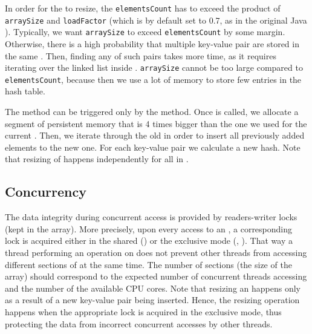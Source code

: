     In order for the \internalHashMap to resize, the \texttt{elementsCount} has to exceed the product of \texttt{arraySize} and \texttt{loadFactor} (which is by default set to 0.7, as in the original Java \HashMap \cite{HashMapJava}).
    Typically, we want \texttt{arraySize} to exceed \texttt{elementsCount} by some margin. 
    Otherwise, there is a high probability that multiple key-value pair are stored in the same \Segment. 
    Then, finding any of such pairs takes more time, as it requires iterating over the linked list inside \Segment. 
    \texttt{arraySize} cannot be too large compared to \texttt{elementsCount}, because then we use a lot of memory to store few entries in the hash table.

    The \expandMethod method can be triggered only by the \insertMethod method.
    Once \expandMethod is called, we allocate a segment of persistent memory that is 4 times bigger than the one we used for the current \internalHashMap. 
    Then, we iterate through the old \internalHashMap in order to insert all previously added elements to the new one. 
    For each key-value pair we calculate a new hash. 
    Note that resizing of \internalHashMap happens independently for all \internalHashMap in \NvmHashMap.

\subsection{Concurrency} 
    
    The data integrity during concurrent access is provided by readers-writer locks (kept in the \locks array). 
    More precisely, upon every access to an \internalHashMap, a corresponding lock is acquired either in the shared (\getMethod) or the exclusive mode (\insertMethod, \removeMethod). 
    That way a thread performing an operation on \PHT does not prevent other threads from accessing different sections of \PHT at the same time. 
    The number of sections (the size of the \internalHashMap array) should correspond to the expected number of concurrent threads accessing \PHT and the number of the available CPU cores. 
    Note that resizing an \internalHashMap happens only as a result of a new key-value pair being inserted. 
    Hence, the resizing operation happens when the appropriate lock is acquired in the exclusive mode, thus protecting the data from incorrect concurrent accesses by other threads.
            
